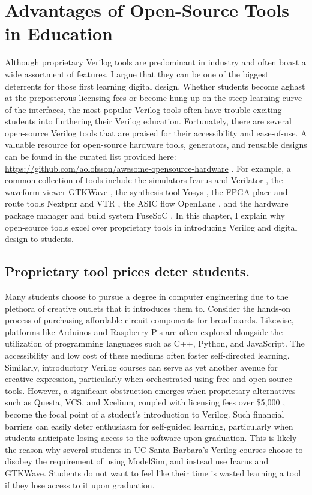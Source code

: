 
\chapter{Advantages of Open-Source Tools in Education}
\label{chapter:open_source_tools}

Although proprietary Verilog tools are predominant in industry and often boast a wide assortment of features, I argue that they can be one of the biggest deterrents for those first learning digital design.
Whether students become aghast at the preposterous licensing fees or become hung up on the steep learning curve of the interfaces, the most popular Verilog tools often have trouble exciting students into furthering their Verilog education.
Fortunately, there are several open-source Verilog tools that are praised for their accessibility and ease-of-use.
A valuable resource for open-source hardware tools, generators, and reusable designs can be found in the curated list provided here: \url{https://github.com/aolofsson/awesome-opensource-hardware} \cite{awesomeOpenSourceHardware}.
For example, a common collection of tools include the simulators Icarus \cite{icarusGitHub} and Verilator \cite{verilatorGitHub}, the waveform viewer GTKWave \cite{gtkwaveGitHub}, the synthesis tool Yosys \cite{yosysGitHub}, the FPGA place and route tools Nextpnr \cite{nextpnrGitHub} and VTR \cite{vtrGitHub}, the ASIC flow OpenLane \cite{OpenLaneGitHub}, and the hardware package manager and build system FuseSoC \cite{fusesocGitHub, edalizeGitHub}.
In this chapter, I explain why open-source tools excel over proprietary tools in introducing Verilog and digital design to students.

\section{Proprietary tool prices deter students.}

Many students choose to pursue a degree in computer engineering due to the plethora of creative outlets that it introduces them to.
Consider the hands-on process of purchasing affordable circuit components for breadboards.
Likewise, platforms like Arduinos and Raspberry Pis are often explored alongside the utilization of programming languages such as C++, Python, and JavaScript.
The accessibility and low cost of these mediums often foster self-directed learning.
Similarly, introductory Verilog courses can serve as yet another avenue for creative expression, particularly when orchestrated using free and open-source tools.
However, a significant obstruction emerges when proprietary alternatives such as Questa, VCS, and Xcelium, coupled with licensing fees over \$5,000 \cite{olofssonLatchUp, licensePricesReddit}, become the focal point of a student's introduction to Verilog.
Such financial barriers can easily deter enthusiasm for self-guided learning, particularly when students anticipate losing access to the software upon graduation.
This is likely the reason why several students in UC Santa Barbara's Verilog courses choose to disobey the requirement of using ModelSim, and instead use Icarus and GTKWave.
Students do not want to feel like their time is wasted learning a tool if they lose access to it upon graduation.


